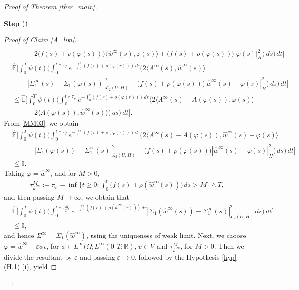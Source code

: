 \documentclass[english,a4paper,11pt]{amsart}
\theoremstyle{plain}
\theoremstyle{definition}
\theoremstyle{remark}
\numberwithin{equation}{section}
\newcounter{lil1}
\newenvironment{step}
{\begin{list} { \bf Step (\Roman{lil1})}
		{ \usecounter{lil1}
			\setlength{\leftmargin}{0.0cm}
			\setlength{\topsep}{0.2cm}
			\setlength{\itemsep}{0.0cm}
			\setlength{\parsep}{0.1cm}
			\setlength{\itemindent}{0.8cm}
			\setlength{\parskip}{0.0cm}}}
	{\end{list}}
\newcounter{lil33}
\newcounter{lil1q}
\newcommand{\wh}{\widehat}
\newcommand{\la}{\langle}
\newcommand{\ra}{\rangle}
\newcommand{\ep} {\varepsilon }
\newcommand{\EE}{ \mathbb{E} }
\newcommand{\R}{\mathbb{R}}
\begin{document}
\begin{proof}[Proof of Theorem \ref{ther_main}]
\begin{step}
\begin{proof}[Proof of Claim \ref{A_lim}]
\begin{align}
	\\&\nonumber\qquad -2\big(f(s)+\rho(\varphi(s))\big)\la \wh{w}^\infty(s),\varphi(s)\ra 
	+\big(f(s)+\rho(\varphi(s))\big) | \varphi(s) | _H^2\bigg)\,ds\bigg)\,dt  \bigg]
\\&	\nonumber\wh{\EE}\bigg[\int_0^T \psi(t)\bigg(\int_0^{t\wedge \tau_\varphi}e^{-\int_0^{s}(f(r)+\rho(\varphi(r)))\, dr}\Big(2\la A^{\infty}(s),\wh{w}^{\infty}(s)\ra \\&\quad \nonumber+  | \Sigma_1^\infty(s)-\Sigma_1(\varphi(s)) | _{\mathcal{L}_2(U,H)}^2 -\big(f(s)+\rho(\varphi(s))\big) | \wh{w}^\infty(s)-\varphi(s) | _H^2\Big)\,ds\bigg)\,dt \bigg] 
	\\& \nonumber\leq 
	{\wh{\EE}}
	\bigg[\int_0^T\psi(t)\bigg( \int_0^{t\wedge \tau_{\varphi}} e^{-\int_0^{s}(f(r)+\rho(\varphi(r)))\, dr}\bigg(2\la A^{\infty} (s)-A(\varphi(s)),\varphi(s)\ra \\&\qquad +2\la A	(\varphi(s)),{\wh{w}}^\infty(s)\ra 
	\bigg)\,ds\bigg)\,dt  \bigg]. 
\end{align}From \eqref{MM03}, we obtain
\begin{align*}
&\nonumber 
\wh{\EE}\bigg[\int_0^T \psi(t)\bigg(\int_0^{t\wedge \tau_\varphi}e^{-\int_0^s(f(r)+\rho(\varphi(r)))\, dr}\Big(2\la A^\infty(s)-A(\varphi(s)),\wh{w}^\infty(s)-\varphi(s)\ra\\&\nonumber\qquad +  | \Sigma_1(\varphi(s))-\Sigma_1^\infty(s) | _{\mathcal{L}_2(U,H)}^2-\big(f(s)+\rho(\varphi(s))\big) | \wh{w}^\infty(s)-\varphi(s) | _H^2 \Big)\,ds\bigg)\,dt\bigg]\\&\leq 0. 
\end{align*}Taking $\varphi=\wh{w}^\infty$, and for $M>0$, 
\begin{align*}
	\tau_{\wh{w}^\infty}^M:=\tau_\varphi=\inf\bigg\{t\geq 0: \int_0^t\big(f(s)+\rho(\wh{w}^\infty(s))\big)\,ds >M\bigg\}\wedge T, 
\end{align*}and then passing $M\to\infty$, we obtain that 
\begin{align*}
	&\wh{\EE}\bigg[\int_0^T \psi(t)\bigg(\int_0^{t\wedge \tau_{\wh{w}^\infty}^M}e^{-\int_0^s(f(r)+\rho(\wh{w}^\infty(r)))\, dr}  | \Sigma_1(\wh{w}^\infty(s))-\Sigma_1^\infty(s) | _{\mathcal{L}_2(U,H)}^2\,ds\bigg)\,dt\bigg]\\&\leq 0,
\end{align*}and hence $\Sigma_1^\infty=\Sigma_1(\wh{w}^\infty)$, using the uniqueness of weak limit. Next, we choose $\varphi=\wh{w}^\infty -\ep \phi v$, for $\phi\in L^\infty(\Omega;L^\infty(0,T;\R)$, $v\in V$ and $\tau_{\wh{w}^\infty}^M$, for $M>0$. Then we divide the resultant by $\ep$ and passing $\ep\to0$, followed by the Hypothesis \ref{hyp} (H.1) (i), yield

\end{proof}
\end{step}
\end{proof}
\end{document}

